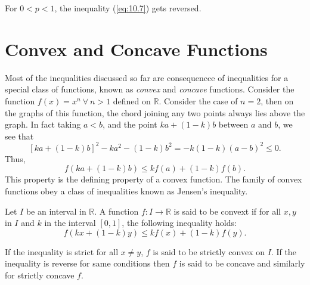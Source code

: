 \begin{remark}
\end{remark} For $0<p<1$, the inequality (\ref{eq:10.7}) gets reversed.

\section{Convex and Concave Functions}
Most of the inequalities discussed so far are consequencce of inequalities for a special class of functions, known as
\textit{convex} and \textit{concave} functions. Consider the function $f(x) = x^n~\forall~n>1$ defined on $\mathbb{R}$. Consider
the case of $n=2$, then on the graphs of this function, the chord joining any two points always lies above the graph. In fact
taking $a<b$, and the point $ka + (1 - k)b$ between $a$ and $b$, we see that
$$[ka + (1 - k)b]^2 - ka^2 - (1 - k)b^2 = -k(1 - k)(a - b)^2\leq 0.$$
Thus,
$$f(ka + (1 - k)b)\leq kf(a) + (1 - k)f(b).$$
This property is the defining property of a convex function. The family of convex functions obey a class of inequalities known as
Jensen's inequality.

Let $I$ be an interval in $\mathbb{R}$. A function $f:I\rightarrow\mathbb{R}$ is said to be convext if for all $x, y$ in $I$ and
$k$ in the interval $[0, 1]$, the following inequality holds:
\begin{equation}
  \label{eq:convex}
  f(kx + (1 - k)y)\leq kf(x) + (1 - k)f(y).
\end{equation}

If the inequality is strict for all $x\neq y$, $f$ is said to be strictly convex on $I$. If the inequality is reverse for same
conditions then $f$ is said to be concave and similarly for strictly concave $f$.

